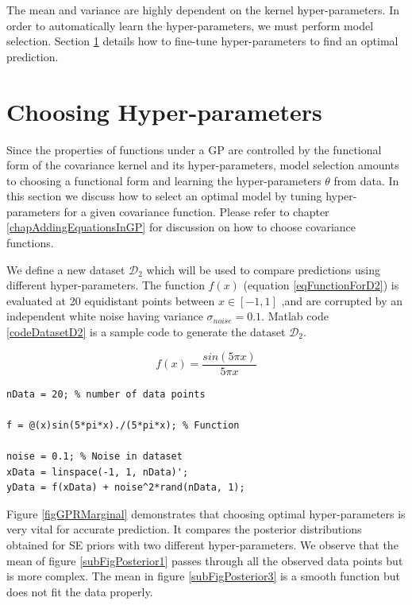 The mean and variance are highly dependent on the kernel hyper-parameters. In order to automatically learn the hyper-parameters, we must perform model selection. Section \ref{secHyperParameter} details how to fine-tune hyper-parameters to find an optimal prediction.

\section{Choosing Hyper-parameters}\label{secHyperParameter}
Since the properties of functions under a GP are controlled by the functional form of the covariance kernel and its hyper-parameters, model selection amounts to choosing a functional form and learning the hyper-parameters $\theta$ from data. In this section we discuss how to select an optimal model by tuning hyper-parameters for a given covariance function. Please refer to chapter \ref{chapAddingEquationsInGP} for discussion on how to choose covariance functions. 

We define a new dataset $\mathcal{D}_{2}$ which will be used to compare predictions using different hyper-parameters. The function $f(x)$ (equation \ref{eqFunctionForD2}) is evaluated at 20 equidistant points between $x \in [-1, 1]$ ,and are corrupted by an independent white noise having variance $\sigma_{noise} = 0.1$. Matlab code \ref{codeDatasetD2} is a sample code to generate the dataset  $\mathcal{D}_{2}$. 

\begin{equation}\label{eqFunctionForD2}
f(x) = \frac{sin(5 \pi x)}{5 \pi x}
\end{equation}

\begin{mdframed}[hidealllines=true,backgroundcolor=lightgray!20]
\begin{lstlisting}[caption={Code for dataset D2}, 
                    captionpos=b, 
                    label={codeDatasetD2},
                    style=Matlab-editor, 
                    backgroundcolor = \color{MatlabCellColour}]
nData = 20; % number of data points

f = @(x)sin(5*pi*x)./(5*pi*x); % Function

noise = 0.1; % Noise in dataset
xData = linspace(-1, 1, nData)';
yData = f(xData) + noise^2*rand(nData, 1);

\end{lstlisting}
\end{mdframed}

Figure \ref{figGPRMarginal} demonstrates that choosing optimal hyper-parameters is very vital for accurate prediction. It compares the posterior distributions obtained for SE priors with two different hyper-parameters. We observe that the mean of figure \ref{subFigPosterior1} passes through all the observed data points but is more complex. The mean in figure \ref{subFigPosterior3} is a smooth function but does not fit the data properly. 


